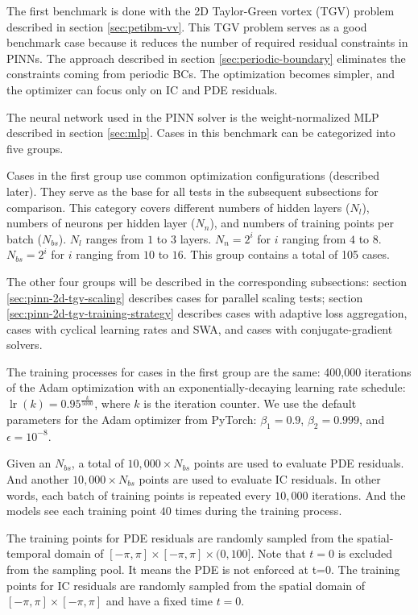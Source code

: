 
The first benchmark is done with the 2D Taylor-Green vortex (TGV) problem described in section \ref{sec:petibm-vv}.
This TGV problem serves as a good benchmark case because it reduces the number of required residual constraints in PINNs.
The approach described in section \ref{sec:periodic-boundary} eliminates the constraints coming from periodic BCs.
The optimization becomes simpler, and the optimizer can focus only on IC and PDE residuals.

The neural network used in the PINN solver is the weight-normalized MLP described in section \ref{sec:mlp}.
Cases in this benchmark can be categorized into five groups.

Cases in the first group use common optimization configurations (described later).
They serve as the base for all tests in the subsequent subsections for comparison.
This category covers different numbers of hidden layers ($N_l$), numbers of neurons per hidden layer ($N_n$), and numbers of training points per batch ($N_{bs}$).
$N_l$ ranges from $1$ to $3$ layers.
$N_n=2^i$ for $i$ ranging from $4$ to $8$.
$N_{bs}=2^i$ for $i$ ranging from $10$ to $16$.
This group contains a total of 105 cases.

The other four groups will be described in the corresponding subsections: section \ref{sec:pinn-2d-tgv-scaling} describes cases for parallel scaling tests; section \ref{sec:pinn-2d-tgv-training-strategy} describes cases with adaptive loss aggregation, cases with cyclical learning rates and SWA, and cases with conjugate-gradient solvers.

The training processes for cases in the first group are the same: 400,000 iterations of the Adam optimization with an exponentially-decaying learning rate schedule: $\operatorname{lr}(k) = 0.95^\frac{k}{5000}$, where $k$ is the iteration counter.
We use the default parameters for the Adam optimizer from PyTorch: $\beta_1=0.9$, $\beta_2=0.999$, and $\epsilon=10^{-8}$.

Given an $N_{bs}$, a total of $10,000 \times N_{bs}$ points are used to evaluate PDE residuals.
And another $10,000 \times N_{bs}$ points are used to evaluate IC residuals.
In other words, each batch of training points is repeated every $10,000$ iterations.
And the models see each training point $40$ times during the training process.

The training points for PDE residuals are randomly sampled from the spatial-temporal domain of $[-\pi, \pi]\times[-\pi, \pi]\times(0, 100]$.
Note that $t=0$ is excluded from the sampling pool.
It means the PDE is not enforced at t=0.
The training points for IC residuals are randomly sampled from the spatial domain of $[-\pi, \pi]\times[-\pi, \pi]$ and have a fixed time $t=0$.

